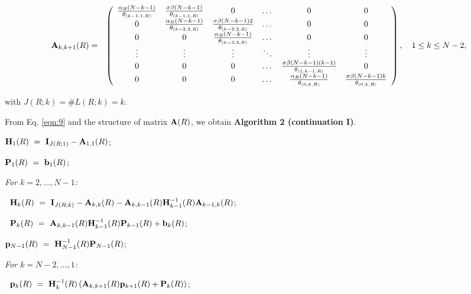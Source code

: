 \documentclass[10pt,A4paper]{article}
\begin{document}
\begin{eqnarray*}
 {\bf A}_{k,k+1}(R) &=& \left(\begin{array}{cccccc}
\frac{\alpha_R(N-k-1)}{\theta_{(k-1,1,R)}} & \frac{\sigma\beta(N-k-1)}{\theta_{(k-1,1,R)}} & 0 & \dots & 0 & 0\\
0 & \frac{\alpha_R(N-k-1)}{\theta_{(k-2,2,R)}} & \frac{\sigma\beta(N-k-1)2}{\theta_{(k-2,2,R)}} & \dots & 0 & 0\\
0 & 0 & \frac{\alpha_R(N-k-1)}{\theta_{(k-3,3,R)}} & \dots & 0 & 0\\
\vdots & \vdots & \vdots & \ddots & \vdots & \vdots\\
0 & 0 & 0 & \dots & \frac{\sigma\beta(N-k-1)(k-1)}{\theta_{(1,k-1,R)}} & 0\\
0 & 0 & 0 & \dots & \frac{\alpha_R(N-k-1)}{\theta_{(0,k,R)}} & \frac{\sigma\beta(N-k-1)k}{\theta_{(0,k,R)}}
                        \end{array}\right),\quad 1\leq k\leq N-2,
\end{eqnarray*}
\par\noindent with $J(R;k)=\#L(R;k)=k$.

\par From Eq. \eqref{eqn:9} and the structure of matrix ${\bf A}(R)$, we obtain {\bf Algorithm 2 (continuation I)}.

\vspace{0.5cm}
\par {}
\begin{description}
  \item ${\bf H}_1(R) ~=~ {\bf I}_{J(R;1)}-{\bf A}_{1,1}(R)$;
  \item ${\bf P}_1(R) ~=~ {\bf b}_1(R)$;
  \item \it For $k=2,\dots,N-1$:
  \item $~$\hspace{0.5cm} ${\bf H}_k(R) ~=~ {\bf I}_{J(R;k)}-{\bf A}_{k,k}(R)-{\bf A}_{k,k-1}(R){\bf H}_{k-1}^{-1}(R){\bf A}_{k-1,k}(R)$;
  \item $~$\hspace{0.5cm} ${\bf P}_k(R) ~=~ {\bf A}_{k,k-1}(R){\bf H}_{k-1}^{-1}(R){\bf P}_{k-1}(R)+{\bf b}_k(R)$;
  \item ${\bf p}_{N-1}(R) ~=~ {\bf H}_{N-1}^{-1}(R){\bf P}_{N-1}(R)$;
  \item \it For $k=N-2,\dots,1$:
  \item $~$\hspace{0.5cm} ${\bf p}_k(R) ~=~ {\bf H}_k^{-1}(R)\left({\bf A}_{k,k+1}(R){\bf p}_{k+1}(R)+{\bf P}_k(R)\right)$;
\end{description}
\vspace{0.5cm}
\end{document}
